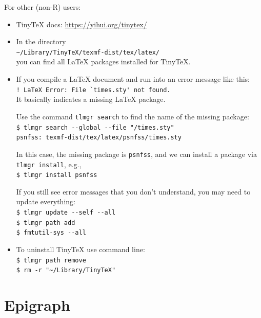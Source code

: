 \documentclass[letterpaper,dvipsnames]{article}
\begin{document}
For other (non-R) users:
\begin{itemize}

    \item TinyTeX docs: \url{https://yihui.org/tinytex/}

    \item In the directory \\
          \verb|~/Library/TinyTeX/texmf-dist/tex/latex/| \\
          you can find all \LaTeX{} packages installed for TinyTeX.
    
    \item If you compile a LaTeX document and run into an error message 
          like this:\\
          \verb+! LaTeX Error: File `times.sty' not found.+ \\
          It basically indicates a missing LaTeX package.

          Use the command \verb+tlmgr search+ to find the name of 
          the missing package:\\
          \verb+$ tlmgr search --global --file "/times.sty"+\\
          \verb+psnfss: texmf-dist/tex/latex/psnfss/times.sty+

          In this case, the missing package is \verb+psnfss+, and we 
          can install a package via \verb+tlmgr install+, e.g., \\
          \verb+$ tlmgr install psnfss+

          If you still see error messages that you don’t understand, 
          you may need to update everything:\\
          \verb+$ tlmgr update --self --all+\\
          \verb+$ tlmgr path add+\\
          \verb+$ fmtutil-sys --all+
    
    \item To uninstall TinyTeX use command line:\\
          \verb+$ tlmgr path remove+\\
          \verb+$ rm -r "~/Library/TinyTeX"+
          
\end{itemize}


\section{Epigraph}
\end{document}
